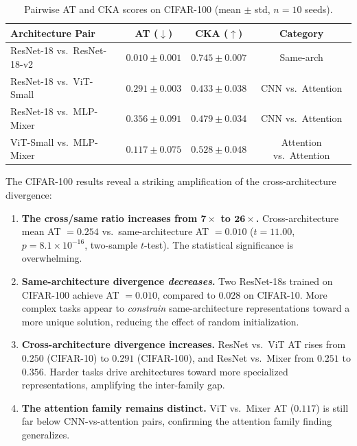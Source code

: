 \documentclass{article}
\begin{document}
\begin{table}[t]
\caption{Pairwise AT and CKA scores on CIFAR-100 (mean $\pm$ std, $n{=}10$ seeds).}
\label{tab:cifar100}
\centering
\small
\begin{tabular}{@{}lccc@{}}
\toprule
Architecture Pair & AT ($\downarrow$) & CKA ($\uparrow$) & Category \\
\midrule
ResNet-18 vs.\ ResNet-18-v2 & $0.010 \pm 0.001$ & $0.745 \pm 0.007$ & Same-arch \\
\midrule
ResNet-18 vs.\ ViT-Small    & $0.291 \pm 0.003$ & $0.433 \pm 0.038$ & CNN vs.\ Attention \\
ResNet-18 vs.\ MLP-Mixer    & $0.356 \pm 0.091$ & $0.479 \pm 0.034$ & CNN vs.\ Attention \\
ViT-Small vs.\ MLP-Mixer    & $0.117 \pm 0.075$ & $0.528 \pm 0.048$ & Attention vs.\ Attention \\
\bottomrule
\end{tabular}
\end{table}

The CIFAR-100 results reveal a striking amplification of the cross-architecture divergence:

\begin{enumerate}
    \item \textbf{The cross/same ratio increases from $\mathbf{7\times}$ to $\mathbf{26\times}$.} Cross-architecture mean AT $= 0.254$ vs.\ same-architecture AT $= 0.010$ ($t = 11.00$, $p = 8.1 \times 10^{-16}$, two-sample $t$-test). The statistical significance is overwhelming.
    \item \textbf{Same-architecture divergence \emph{decreases}.} Two ResNet-18s trained on CIFAR-100 achieve AT $= 0.010$, compared to $0.028$ on CIFAR-10. More complex tasks appear to \emph{constrain} same-architecture representations toward a more unique solution, reducing the effect of random initialization.
    \item \textbf{Cross-architecture divergence increases.} ResNet vs.\ ViT AT rises from $0.250$ (CIFAR-10) to $0.291$ (CIFAR-100), and ResNet vs.\ Mixer from $0.251$ to $0.356$. Harder tasks drive architectures toward more specialized representations, amplifying the inter-family gap.
    \item \textbf{The attention family remains distinct.} ViT vs.\ Mixer AT ($0.117$) is still far below CNN-vs-attention pairs, confirming the attention family finding generalizes.
\end{enumerate}
\end{document}
